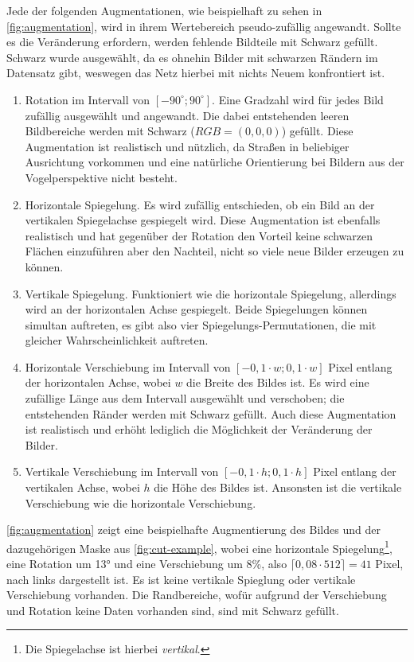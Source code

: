 Jede der folgenden Augmentationen, wie beispielhaft zu sehen in \autoref{fig:augmentation}, wird in ihrem Wertebereich pseudo-zufällig angewandt. 
Sollte es die Veränderung erfordern, werden fehlende Bildteile mit Schwarz gefüllt. Schwarz wurde ausgewählt, da es ohnehin Bilder mit 
schwarzen Rändern im Datensatz gibt, weswegen das Netz hierbei mit nichts Neuem konfrontiert ist. 
\begin{enumerate}
	\item Rotation im Intervall von $[-90^\circ ; 90^\circ ]$. Eine Gradzahl wird für jedes Bild zufällig ausgewählt und angewandt. 
	Die dabei entstehenden leeren Bildbereiche werden mit Schwarz ($RGB = (0,0,0)$) gefüllt. 
	Diese Augmentation ist realistisch und nützlich, da Straßen in beliebiger Ausrichtung vorkommen und 
	eine natürliche Orientierung bei Bildern aus der Vogelperspektive nicht besteht.
	\item Horizontale Spiegelung. Es wird zufällig entschieden, ob ein Bild an der vertikalen Spiegelachse gespiegelt wird. 
	Diese Augmentation ist ebenfalls realistisch und hat gegenüber der Rotation den Vorteil keine schwarzen Flächen 
	einzuführen aber den Nachteil, nicht so viele neue Bilder erzeugen zu können. 
	\item Vertikale Spiegelung. Funktioniert wie die horizontale Spiegelung, allerdings wird an der horizontalen Achse gespiegelt. 
	Beide Spiegelungen können simultan auftreten, es gibt also vier Spiegelungs-Permutationen, 
	die mit gleicher Wahrscheinlichkeit auftreten.
	\item Horizontale Verschiebung im Intervall von $[-0,1 \cdot w; 0,1 \cdot w]$ Pixel entlang der horizontalen Achse,
	wobei $w$ die Breite des Bildes ist. Es wird eine zufällige Länge aus dem Intervall ausgewählt und verschoben; die 
	entstehenden Ränder werden mit Schwarz gefüllt. Auch diese Augmentation ist realistisch und erhöht lediglich 
	die Möglichkeit der Veränderung der Bilder. 
	\item Vertikale Verschiebung im Intervall von $[-0,1 \cdot h; 0,1 \cdot h]$ Pixel entlang der vertikalen Achse,
	wobei $h$ die Höhe des Bildes ist. Ansonsten ist die vertikale Verschiebung wie die horizontale Verschiebung.    
\end{enumerate} 

\autoref{fig:augmentation} zeigt eine beispielhafte Augmentierung des Bildes und der dazugehörigen Maske aus \autoref{fig:cut-example},
wobei eine horizontale Spiegelung\footnote{Die Spiegelachse ist hierbei \textit{vertikal}.},
eine Rotation um 13° und eine Verschiebung um 8\%, also $\lceil 0,08 \cdot 512 \rceil = 41$ Pixel, 
nach links dargestellt ist. Es ist keine vertikale Spieglung oder vertikale Verschiebung vorhanden.
Die Randbereiche, wofür aufgrund der Verschiebung und Rotation keine Daten vorhanden sind, sind mit Schwarz gefüllt. 

